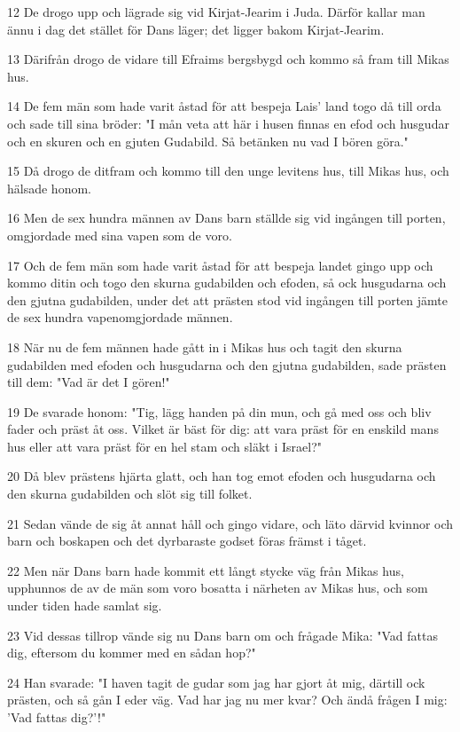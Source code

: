 \par 12 De drogo upp och lägrade sig vid Kirjat-Jearim i Juda. Därför kallar man ännu i dag det stället för Dans läger; det ligger bakom Kirjat-Jearim.
\par 13 Därifrån drogo de vidare till Efraims bergsbygd och kommo så fram till Mikas hus.
\par 14 De fem män som hade varit åstad för att bespeja Lais' land togo då till orda och sade till sina bröder: "I mån veta att här i husen finnas en efod och husgudar och en skuren och en gjuten Gudabild. Så betänken nu vad I bören göra."
\par 15 Då drogo de ditfram och kommo till den unge levitens hus, till Mikas hus, och hälsade honom.
\par 16 Men de sex hundra männen av Dans barn ställde sig vid ingången till porten, omgjordade med sina vapen som de voro.
\par 17 Och de fem män som hade varit åstad för att bespeja landet gingo upp och kommo ditin och togo den skurna gudabilden och efoden, så ock husgudarna och den gjutna gudabilden, under det att prästen stod vid ingången till porten jämte de sex hundra vapenomgjordade männen.
\par 18 När nu de fem männen hade gått in i Mikas hus och tagit den skurna gudabilden med efoden och husgudarna och den gjutna gudabilden, sade prästen till dem: "Vad är det I gören!"
\par 19 De svarade honom: "Tig, lägg handen på din mun, och gå med oss och bliv fader och präst åt oss. Vilket är bäst för dig: att vara präst för en enskild mans hus eller att vara präst för en hel stam och släkt i Israel?"
\par 20 Då blev prästens hjärta glatt, och han tog emot efoden och husgudarna och den skurna gudabilden och slöt sig till folket.
\par 21 Sedan vände de sig åt annat håll och gingo vidare, och läto därvid kvinnor och barn och boskapen och det dyrbaraste godset föras främst i tåget.
\par 22 Men när Dans barn hade kommit ett långt stycke väg från Mikas hus, upphunnos de av de män som voro bosatta i närheten av Mikas hus, och som under tiden hade samlat sig.
\par 23 Vid dessas tillrop vände sig nu Dans barn om och frågade Mika: "Vad fattas dig, eftersom du kommer med en sådan hop?"
\par 24 Han svarade: "I haven tagit de gudar som jag har gjort åt mig, därtill ock prästen, och så gån I eder väg. Vad har jag nu mer kvar? Och ändå frågen I mig: 'Vad fattas dig?'!"
